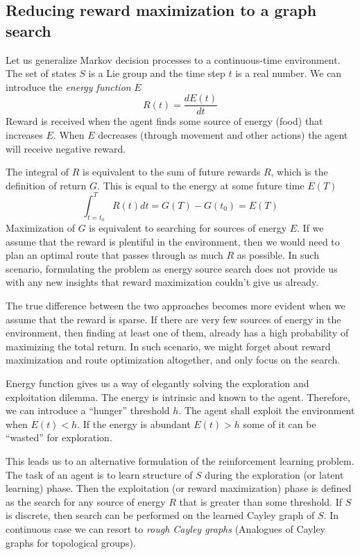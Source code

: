 \documentclass[12pt]{article}
\begin{document}
\subsection{Reducing reward maximization to a graph search}

Let us generalize Markov decision processes to a continuous-time environment. The set of states $S$ is a Lie group and the time step $t$ is a real number. We can introduce the \textit{energy function} $E$
\[
R(t) = \frac{dE(t)}{dt}
\]
Reward is received when the agent finds some source of energy (food) that increases $E$. When $E$ decreases (through movement and other actions) the agent will receive negative reward. 

The integral of $R$ is equivalent to the sum of future rewards $R$, which is the definition of return $G$. This is equal to the energy at some future time $E(T)$
\[
\int_{t=t_0}^{T} R(t) dt = G(T) - G(t_0) = E(T)
\]
Maximization of $G$ is equivalent to searching for sources of energy $E$. If we assume that the reward is plentiful in the environment, then we would need to plan an optimal route that passes through as much $R$ as possible. In such scenario, formulating the problem as energy source search does not provide us with any new insights that reward maximization couldn't give us already. 

The true difference between the two approaches becomes more evident when we assume that the reward is sparse. If there are very few sources of energy in the environment, then finding at least one of them, already has a high probability of maximizing the total return. In such scenario, we might forget about reward maximization and route optimization altogether, and only focus on the search. 

Energy function gives us a way of elegantly solving the exploration and exploitation dilemma. The energy is intrinsic and known to the agent. Therefore, we can introduce a ``hunger'' threshold $h$. The agent shall exploit the environment when $E(t) < h$. If the energy is abundant $E(t)>h$ some of it can be ``wasted'' for exploration. 

This leads us to an alternative formulation of the reinforcement learning problem.
The task of an agent is to learn structure of $S$ during the exploration (or latent learning) phase. Then the exploitation (or reward maximization) phase is defined as the search for any source of energy $R$ that is greater than some threshold. If $S$ is discrete, then search can be performed on the learned Cayley graph of $S$. In continuous case we can resort to \textit{rough Cayley graphs} (Analogues of Cayley graphs for topological groups). 
\end{document}
